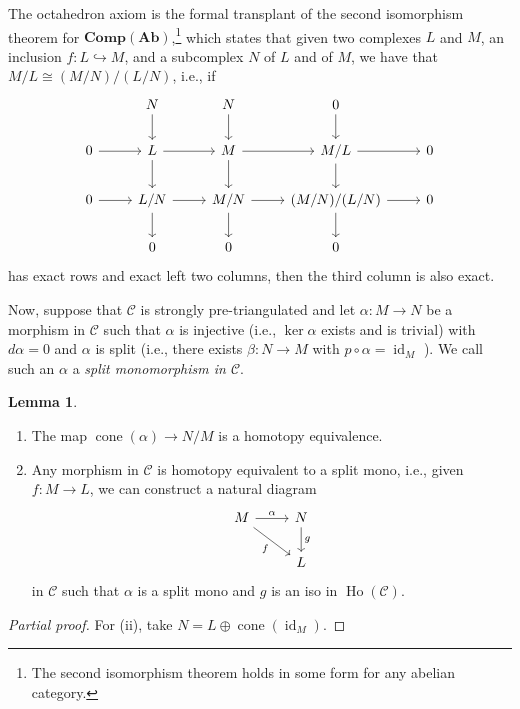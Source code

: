 \documentclass[10pt,letterpaper,cm]{nupset}
\theoremstyle{definition}
\theoremstyle{theorem}
\newtheorem{lemma}[definition]{Lemma}
\theoremstyle{remark}
\newcommand{\1}{\mathbf{1}}
\renewcommand{\c}{\mathscr{C}}
\newcommand{\0}{\vec 0}
\DeclareMathOperator{\id}{id}
\DeclareMathOperator{\cone}{cone}
\DeclareMathOperator{\ho}{Ho}
\begin{document}
The octahedron axiom is the formal transplant of the second isomorphism theorem for $\mathbf{Comp}(\mathbf{Ab})$,\footnote{The second isomorphism theorem holds in some form for any abelian category.} which states that given two complexes $L$ and $M$, an inclusion $f : L \hookrightarrow M$, and a subcomplex $N$ of $L$ and of $M$, we have that $ M/L \cong (M/N)/(L/N)$, i.e., if
\[
\begin{tikzcd}
            & N \arrow[d]   & N \arrow[d]   & 0 \arrow[d]                     &   \\
0 \arrow[r] & L \arrow[d] \arrow[r]   & M \arrow[d] \arrow[r]   & M/L \arrow[d] \arrow[r]         & 0 \\
0 \arrow[r] & L/N \arrow[d] \arrow[r] & M/N \arrow[d] \arrow[r] & (M/N)/(L/N) \arrow[d] \arrow[r] & 0 \\
            & 0                       & 0                       & 0                               &  
\end{tikzcd}
\]
has exact rows and exact left two columns, then the third column is also exact. 

\medskip

Now, suppose that $\c$ is strongly pre-triangulated and let $\alpha : M \to N$ be a morphism in $\c$ such that $\alpha$ is injective (i.e., $\ker{\alpha}$ exists and is trivial) with $d{\alpha} =0$ and $\alpha$ is split (i.e.,  there exists $\beta : N \to M$ with $p \circ \alpha = \id_M$ ). We call such an $\alpha$ a \textit{split monomorphism in $\c$}. 

\begin{lemma}\label{PL1} $ $
\begin{enumerate}[label=(\roman*)]
\item The map $\cone(\alpha) \to N/M$ is a homotopy equivalence.
\item Any morphism in $\c$ is homotopy equivalent to a split mono, i.e., given $ f: M \to L$, we can construct a natural diagram 
\[
\begin{tikzcd}
M \arrow[r, "\alpha"] \arrow[rd, "f"'] & N \arrow[d, "g"] \\
                                       & L               
\end{tikzcd}
\]
in $\c$ such that $\alpha$ is a split mono and $g$ is an iso in $\ho(\c)$.
\end{enumerate}
\end{lemma}
\begin{proof}[Partial proof]
For (ii), take $N = L \oplus \cone(\id_M)$.
\end{proof}
\end{document}
